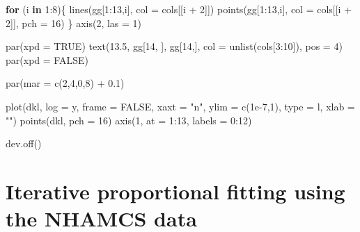 \documentclass[
]{article}
\newenvironment{Shaded}{\begin{snugshade}}{\end{snugshade}}
\newcommand{\AttributeTok}[1]{\textcolor[rgb]{0.77,0.63,0.00}{#1}}
\newcommand{\ConstantTok}[1]{\textcolor[rgb]{0.00,0.00,0.00}{#1}}
\newcommand{\ControlFlowTok}[1]{\textcolor[rgb]{0.13,0.29,0.53}{\textbf{#1}}}
\newcommand{\DecValTok}[1]{\textcolor[rgb]{0.00,0.00,0.81}{#1}}
\newcommand{\FloatTok}[1]{\textcolor[rgb]{0.00,0.00,0.81}{#1}}
\newcommand{\FunctionTok}[1]{\textcolor[rgb]{0.00,0.00,0.00}{#1}}
\newcommand{\NormalTok}[1]{#1}
\newcommand{\SpecialCharTok}[1]{\textcolor[rgb]{0.00,0.00,0.00}{#1}}
\newcommand{\StringTok}[1]{\textcolor[rgb]{0.31,0.60,0.02}{#1}}
\begin{document}
\begin{Shaded}
\begin{Highlighting}[]
\ControlFlowTok{for}\NormalTok{ (i }\ControlFlowTok{in} \DecValTok{1}\SpecialCharTok{:}\DecValTok{8}\NormalTok{)\{}
  \FunctionTok{lines}\NormalTok{(gg[}\DecValTok{1}\SpecialCharTok{:}\DecValTok{13}\NormalTok{,i], }\AttributeTok{col =}\NormalTok{ cols[[i }\SpecialCharTok{+} \DecValTok{2}\NormalTok{]])}
  \FunctionTok{points}\NormalTok{(gg[}\DecValTok{1}\SpecialCharTok{:}\DecValTok{13}\NormalTok{,i], }\AttributeTok{col =}\NormalTok{ cols[[i }\SpecialCharTok{+} \DecValTok{2}\NormalTok{]], }\AttributeTok{pch =} \DecValTok{16}\NormalTok{)}
\NormalTok{\}}
\FunctionTok{axis}\NormalTok{(}\DecValTok{2}\NormalTok{, }\AttributeTok{las =} \DecValTok{1}\NormalTok{)}

\FunctionTok{par}\NormalTok{(}\AttributeTok{xpd =} \ConstantTok{TRUE}\NormalTok{)}
\FunctionTok{text}\NormalTok{(}\FloatTok{13.5}\NormalTok{, gg[}\DecValTok{14}\NormalTok{, ], gg[}\DecValTok{14}\NormalTok{,], }\AttributeTok{col =} \FunctionTok{unlist}\NormalTok{(cols[}\DecValTok{3}\SpecialCharTok{:}\DecValTok{10}\NormalTok{]), }\AttributeTok{pos =} \DecValTok{4}\NormalTok{)}
\FunctionTok{par}\NormalTok{(}\AttributeTok{xpd =} \ConstantTok{FALSE}\NormalTok{)}

\FunctionTok{par}\NormalTok{(}\AttributeTok{mar =} \FunctionTok{c}\NormalTok{(}\DecValTok{2}\NormalTok{,}\DecValTok{4}\NormalTok{,}\DecValTok{0}\NormalTok{,}\DecValTok{8}\NormalTok{) }\SpecialCharTok{+} \FloatTok{0.1}\NormalTok{)}

\FunctionTok{plot}\NormalTok{(dkl, }\AttributeTok{log =} \StringTok{\textquotesingle{}y\textquotesingle{}}\NormalTok{, }\AttributeTok{frame =} \ConstantTok{FALSE}\NormalTok{, }\AttributeTok{xaxt =} \StringTok{"n"}\NormalTok{, }\AttributeTok{ylim =} \FunctionTok{c}\NormalTok{(}\FloatTok{1e{-}7}\NormalTok{,}\DecValTok{1}\NormalTok{), }\AttributeTok{type =} \StringTok{\textquotesingle{}l\textquotesingle{}}\NormalTok{, }\AttributeTok{xlab =} \StringTok{""}\NormalTok{)}
\FunctionTok{points}\NormalTok{(dkl, }\AttributeTok{pch =} \DecValTok{16}\NormalTok{)}
\FunctionTok{axis}\NormalTok{(}\DecValTok{1}\NormalTok{, }\AttributeTok{at =} \DecValTok{1}\SpecialCharTok{:}\DecValTok{13}\NormalTok{, }\AttributeTok{labels =} \DecValTok{0}\SpecialCharTok{:}\DecValTok{12}\NormalTok{)}

\FunctionTok{dev.off}\NormalTok{()}
\end{Highlighting}
\end{Shaded}

\hypertarget{iterative-proportional-fitting-using-the-nhamcs-data}{%
\section{Iterative proportional fitting using the NHAMCS
data}\label{iterative-proportional-fitting-using-the-nhamcs-data}}
\end{document}
